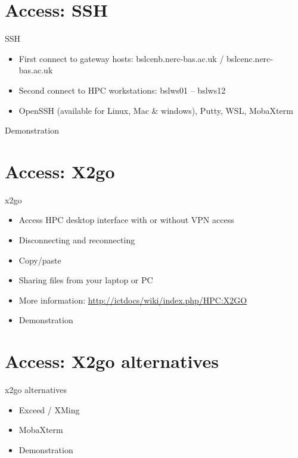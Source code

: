 {
\section{Access: SSH}
%
\begin{frame}{SSH}
\begin{itemize}
\item First connect to gateway hosts: bslcenb.nerc-bas.ac.uk / bslcenc.nerc-bas.ac.uk
\item Second connect to HPC workstations: bslws01 – bslws12
\item OpenSSH (available for Linux, Mac & windows), Putty, WSL, MobaXterm
\end{itemize}
\pause
\item{{\color{red}Demonstration}}
\end{frame}
}

{
\section{Access: X2go}
%
\begin{frame}{x2go}
\begin{itemize}
\item Access HPC desktop interface with or without VPN access
\item Disconnecting and reconnecting
\item Copy/paste
\item Sharing files from your laptop or PC
\item More information: \href{http://ictdocs/wiki/index.php/HPC:X2GO}{http://ictdocs/wiki/index.php/HPC:X2GO}
\pause
\item{{\color{red}Demonstration}}
\end{itemize}
\end{frame}
}

{
\section{Access: X2go alternatives}
%
\begin{frame}{x2go alternatives}
\begin{itemize}
\item Exceed / XMing
\item MobaXterm
\pause
\item{{\color{red}Demonstration}}
\end{itemize}
\end{frame}
}

